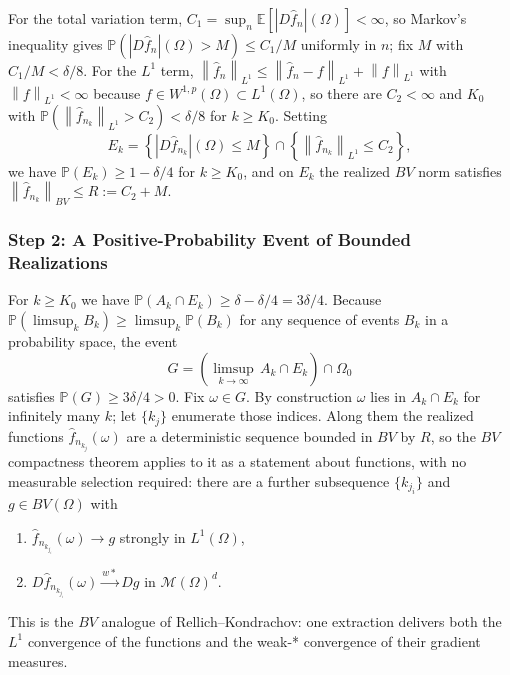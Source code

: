\documentclass[12pt,a4paper]{article}
\numberwithin{equation}{section}
\theoremstyle{plain}
\theoremstyle{definition}
\newcommand{\norm}[1]{\left\| #1 \right\|}
\newcommand{\E}{\mathbb{E}}
\newcommand{\Lone}{L^1(\Omega)}
\newcommand{\Wonep}{W^{1,p}(\Omega)}
\newcommand{\BV}{BV(\Omega)}
\newcommand{\cM}{\mathcal{M}(\Omega)^d}
\newcommand{\fn}{\hat{f}_n}
\newcommand{\Prob}{\mathbb{P}}
\begin{document}
	For the total variation term, $C_1 = \sup_n \E[|D\fn|(\Omega)] < \infty$,
	so Markov's inequality gives $\Prob(|D\fn|(\Omega) > M) \leq C_1/M$
	uniformly in $n$; fix $M$ with $C_1/M < \delta/8$. For the $L^1$ term,
	$\norm{\fn}_{L^1} \leq \norm{\fn - f}_{L^1} + \norm{f}_{L^1}$ with
	$\norm{f}_{L^1} < \infty$ because $f \in \Wonep \subset \Lone$, so there are
	$C_2 < \infty$ and $K_0$ with
	$\Prob(\norm{\hat{f}_{n_k}}_{L^1} > C_2) < \delta/8$ for $k \geq K_0$.
	Setting
	\begin{equation}
		E_k = \left\{|D\hat{f}_{n_k}|(\Omega) \leq M\right\} \cap
		\left\{\norm{\hat{f}_{n_k}}_{L^1} \leq C_2\right\} ,
	\end{equation}
	we have $\Prob(E_k) \geq 1 - \delta/4$ for $k \geq K_0$, and on $E_k$ the
	realized $BV$ norm satisfies
	$\norm{\hat{f}_{n_k}}_{BV} \leq R := C_2 + M$.

	\subsubsection*{Step 2: A Positive-Probability Event of Bounded Realizations}

	For $k \geq K_0$ we have $\Prob(A_k \cap E_k) \geq \delta - \delta/4 =
	3\delta/4$. Because $\Prob(\limsup_k B_k) \geq \limsup_k \Prob(B_k)$ for any
	sequence of events $B_k$ in a probability space, the event
	\begin{equation}
		G = \left(\limsup_{k \to \infty} \, A_k \cap E_k\right) \cap \Omega_0
	\end{equation}
	satisfies $\Prob(G) \geq 3\delta/4 > 0$. Fix $\omega \in G$. By
	construction $\omega$ lies in $A_k \cap E_k$ for infinitely many $k$; let
	$\{k_j\}$ enumerate those indices. Along them the realized functions
	$\hat{f}_{n_{k_j}}(\omega)$ are a deterministic sequence bounded in $BV$ by
	$R$, so the $BV$ compactness theorem
	\citep[Theorem~5.5]{evans2015measure} applies to it as a statement about
	functions, with no measurable selection required: there are a further
	subsequence $\{k_{j_i}\}$ and $g \in \BV$ with
	\begin{enumerate}
		\item $\hat{f}_{n_{k_{j_i}}}(\omega) \to g$ strongly in $\Lone$,
		\item $D\hat{f}_{n_{k_{j_i}}}(\omega) \xrightarrow{w*} Dg$ in $\cM$.
	\end{enumerate}
	This is the $BV$ analogue of Rellich--Kondrachov: one extraction delivers
	both the $L^1$ convergence of the functions and the weak-* convergence of
	their gradient measures.
\end{document}
